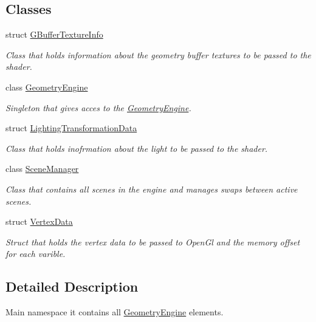 \subsection*{Classes}
\begin{DoxyCompactItemize}
\item 
struct \mbox{\hyperlink{struct_geometry_engine_1_1_g_buffer_texture_info}{G\+Buffer\+Texture\+Info}}
\begin{DoxyCompactList}\small\item\em Class that holds information about the geometry buffer textures to be passed to the shader. \end{DoxyCompactList}\item 
class \mbox{\hyperlink{class_geometry_engine_1_1_geometry_engine}{Geometry\+Engine}}
\begin{DoxyCompactList}\small\item\em Singleton that gives acces to the \mbox{\hyperlink{class_geometry_engine_1_1_geometry_engine}{Geometry\+Engine}}. \end{DoxyCompactList}\item 
struct \mbox{\hyperlink{struct_geometry_engine_1_1_lighting_transformation_data}{Lighting\+Transformation\+Data}}
\begin{DoxyCompactList}\small\item\em Class that holds inofrmation about the light to be passed to the shader. \end{DoxyCompactList}\item 
class \mbox{\hyperlink{class_geometry_engine_1_1_scene_manager}{Scene\+Manager}}
\begin{DoxyCompactList}\small\item\em Class that contains all scenes in the engine and manages swaps between active scenes. \end{DoxyCompactList}\item 
struct \mbox{\hyperlink{struct_geometry_engine_1_1_vertex_data}{Vertex\+Data}}
\begin{DoxyCompactList}\small\item\em Struct that holds the vertex data to be passed to Open\+Gl and the memory offset for each varible. \end{DoxyCompactList}\end{DoxyCompactItemize}


\subsection{Detailed Description}
Main namespace it contains all \mbox{\hyperlink{namespace_geometry_engine}{Geometry\+Engine}} elements. 